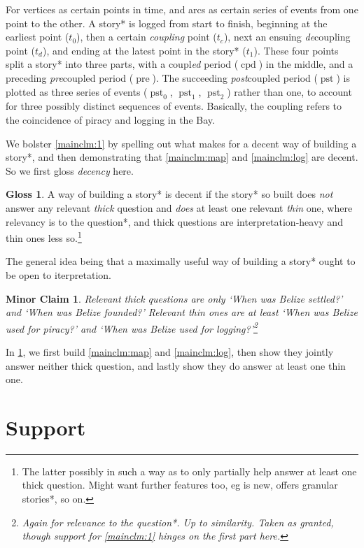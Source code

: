 \documentclass{amsart}
\newcommand{\mention}[1]{\textit{#1}}%
\DeclareMathOperator{\pre}{pre}%
\DeclareMathOperator{\pst}{pst}%
\DeclareMathOperator{\cpd}{cpd}%
\newtheorem{minrclm}{Minor Claim}%
\theoremstyle{definition}
\newtheorem{gloss}{Gloss}%
\theoremstyle{remark}
\begin{document}
	For vertices as certain points in time, and arcs as certain series of events from one point to the other. A story* is logged from start to finish, beginning at the earliest point (\(t_{0}\)), then a certain \mention{coupling} point (\(t_{c}\)), next an ensuing \mention{de}coupling point (\(t_{d}\)), and ending at the latest point in the story* (\(t_{1}\)). These four points split a story* into three parts, with a coupl\mention{ed} period (\(\cpd\)) in the middle, and a preceding \mention{pre}coupled period (\(\pre\)). The succeeding \mention{post}coupled period (\(\pst\)) is plotted as three series of events (\(\pst_{0}\), \(\pst_{1}\), \(\pst_{2}\)) rather than one, to account for three possibly distinct sequences of events. Basically, the coupling refers to the coincidence of piracy and logging in the Bay.
	
	We bolster \ref{mainclm:1} by spelling out what makes for a decent way of building a story*, and then demonstrating that \ref{mainclm:map} and \ref{mainclm:log} are decent. So we first gloss \mention{decency} here.
	\begin{gloss}
	\label{gloss:decency}
		A way of building a story* is decent if the story* so built does \emph{not} answer any relevant \mention{thick} question and \emph{does} at least one relevant \mention{thin} one, where relevancy is to the question*, and thick questions are interpretation-heavy and thin ones less so.\footnote{The latter possibly in such a way as to only partially help answer at least one thick question. Might want further features too, eg is new, offers granular stories*, so on.}
	\end{gloss}
	The general idea being that a maximally useful way of building a story* ought to be open to iterpretation.
	\begin{minrclm}
	\label{minrclm:questions}
	Relevant thick questions are only `When was Belize settled?' and `When was Belize founded?' Relevant thin ones are at least `When was Belize used for piracy?' and `When was Belize used for logging?'\footnote{Again for relevance to the question*. Up to similarity. Taken as granted, though support for \ref{mainclm:1} hinges on the first part here.}
	\end{minrclm}
	In \ref{s:support}, we first build \ref{mainclm:map} and \ref{mainclm:log}, then show they jointly answer neither thick question, and lastly show they do answer at least one thin one.
%
%
%
\section{Support}
	\label{s:support}
\end{document}
